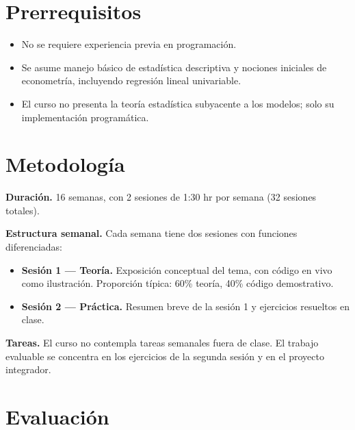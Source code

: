\documentclass[11pt,letterpaper]{article}
\newcommand{\blue}[1]{{\color{cerulean}#1}}
\newcommand{\orange}[1]{{\color{redorange}#1}}
\begin{document}
\section{Prerrequisitos}

\begin{itemize}[leftmargin=*]
    \item No se requiere experiencia previa en programación.
    \item Se asume manejo básico de estadística descriptiva y nociones iniciales de econometría, incluyendo regresión lineal univariable.
    \item El curso no presenta la teoría estadística subyacente a los modelos; solo su implementación programática.
\end{itemize}

\section{Metodología}

\textbf{Duración.} 16 semanas, con 2 sesiones de 1:30 hr por semana (32 sesiones totales).

\textbf{Estructura semanal.} Cada semana tiene dos sesiones con funciones diferenciadas:

\begin{itemize}[leftmargin=*]
    \item \textbf{\blue{Sesión 1 --- Teoría.}} Exposición conceptual del tema, con código en vivo como ilustración. Proporción típica: 60\% teoría, 40\% código demostrativo.
    \item \textbf{\orange{Sesión 2 --- Práctica.}} Resumen breve de la sesión 1 y ejercicios resueltos en clase.
\end{itemize}

\textbf{Tareas.} El curso no contempla tareas semanales fuera de clase. El trabajo evaluable se concentra en los ejercicios de la segunda sesión y en el proyecto integrador.

\section{Evaluación}
\end{document}
